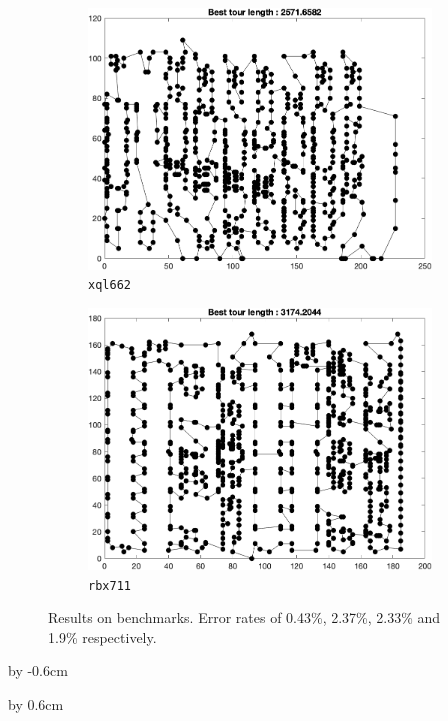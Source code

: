 \begin{figure}[H]
\begin{subfigure}[b]{0.45\textwidth}
		\includegraphics[width=\textwidth]{benchmarks/final/xql662.png}
		\caption{\texttt{xql662}}
    	\end{subfigure}
	\begin{subfigure}[b]{0.45\textwidth}
		\centering
		\includegraphics[width=\textwidth]{benchmarks/final/rbx711.png}
		\caption{\texttt{rbx711}}
    	\end{subfigure}
\caption{Results on benchmarks. Error rates of 0.43\%, 2.37\%, 2.33\% and 1.9\% respectively.}
\label{fig:bench1}
\end{figure}

\newpage
\advance\voffset by -0.6cm

\advance\voffset by 0.6cm



